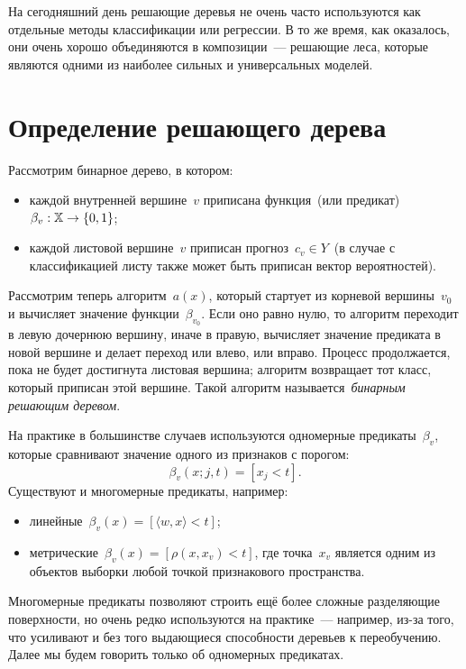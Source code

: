 \documentclass[12pt,fleqn]{article}
\begin{document}
На сегодняшний день решающие деревья не очень часто используются как отдельные методы классификации или регрессии.
В то же время, как оказалось, они очень хорошо объединяются в композиции~--- решающие леса,
которые являются одними из наиболее сильных и универсальных моделей.

\section{Определение решающего дерева}
Рассмотрим бинарное дерево, в котором:
\begin{itemize}
    \item каждой внутренней вершине~$v$ приписана функция~(или предикат)~$\beta_v: \mathbb{X} \to \{0, 1\}$;
    \item каждой листовой вершине~$v$ приписан прогноз~$c_v \in Y$~(в случае с классификацией
        листу также может быть приписан вектор вероятностей).
\end{itemize}
Рассмотрим теперь алгоритм~$a(x)$, который стартует из корневой вершины~$v_0$
и вычисляет значение функции~$\beta_{v_0}$.
Если оно равно нулю, то алгоритм переходит в левую дочернюю вершину, иначе в правую,
вычисляет значение предиката в новой вершине и делает переход или влево, или вправо.
Процесс продолжается, пока не будет достигнута листовая вершина;
алгоритм возвращает тот класс, который приписан этой вершине.
Такой алгоритм называется~\emph{бинарным решающим деревом}.

На практике в большинстве случаев используются одномерные предикаты~$\beta_v$,
которые сравнивают значение одного из признаков с порогом:
\[
    \beta_v(x; j, t)
    =
    [x_j < t].
\]
Существуют и многомерные предикаты, например:
\begin{itemize}
    \item линейные~$\beta_v(x) = [\langle w, x \rangle < t]$;
    \item метрические~$\beta_v(x) = [\rho(x, x_v) < t]$, где точка~$x_v$ является одним из объектов выборки любой точкой
        признакового пространства.
\end{itemize}
Многомерные предикаты позволяют строить ещё более сложные разделяющие поверхности,
но очень редко используются на практике~--- например, из-за того,
что усиливают и без того выдающиеся способности деревьев к переобучению.
Далее мы будем говорить только об одномерных предикатах.
\end{document}
